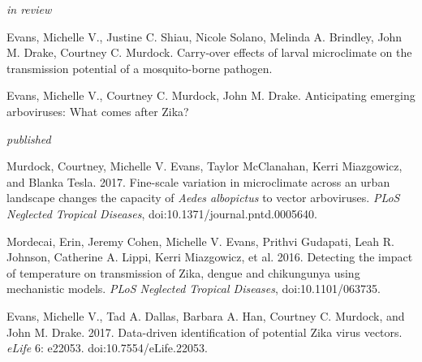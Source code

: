 

\begin{cvitems}

\bigskip
\smallskip
\textit{in review}
\smallskip

\item \textcolor{awesome}{Evans, Michelle V.}, Justine C. Shiau, Nicole Solano, Melinda A. Brindley, John M. Drake, Courtney C. Murdock. Carry-over effects of larval microclimate on the transmission potential of a mosquito-borne pathogen.
\smallskip

\item \textcolor{awesome}{Evans, Michelle V.}, Courtney C. Murdock, John M. Drake. Anticipating emerging arboviruses: What comes after Zika?


\bigskip
\textit{published}
\smallskip

\item Murdock, Courtney, \textcolor{awesome}{Michelle V. Evans}, Taylor McClanahan, Kerri Miazgowicz, and Blanka Tesla. 2017. Fine-scale variation in microclimate across an urban landscape changes the capacity of \textit{Aedes albopictus} to vector arboviruses. \textit{PLoS Neglected Tropical Diseases}, doi:10.1371/journal.pntd.0005640.
\smallskip

\item Mordecai, Erin, Jeremy Cohen, \textcolor{awesome}{Michelle V. Evans}, Prithvi Gudapati, Leah R. Johnson, Catherine A. Lippi, Kerri Miazgowicz, et al. 2016. Detecting the impact of temperature on transmission of Zika, dengue and chikungunya using mechanistic models. \textit{PLoS Neglected Tropical Diseases}, doi:10.1101/063735.
\smallskip

\item \textcolor{awesome}{Evans, Michelle V.}, Tad A. Dallas, Barbara A. Han, Courtney C. Murdock, and John M. Drake. 2017. Data-driven identification of potential Zika virus vectors. \textit{eLife} 6: e22053. doi:10.7554/eLife.22053.

\bigskip
\end{cvitems}
